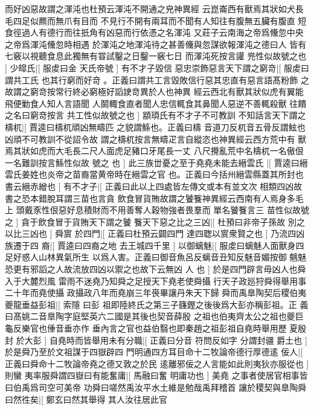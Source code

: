 而好凶惡故謂之渾沌也杜預云渾沌不開通之皃神異經%
%
云崑崙西有獸焉其狀如犬長毛四足似羆而無爪有目而%
不見行不開有兩耳而不聞有人知往有腹無五臟有腹直%
%
短食徑過人有德行而往扺角有凶惡而行依憑之名渾沌%
又莊子云南海之帝爲儵忽中央之帝爲渾沌儵忽時相遇%
%
於渾沌之地渾沌待之甚善儵與忽謀欲報渾沌之德曰人%
皆有七竅以視聽食息此獨無有甞試鑿之日鑿一竅七日%
%
而渾沌死按言讙%
兠性似故號之也%
]%
少皡氏|[%
服䖍曰金%
天氏帝號%
]%
有不才子毀信%
惡忠崇飾惡言天下謂之窮竒|[%
服䖍曰謂共工氏%
也其行窮而好竒%
%
。正義曰謂共工言毀敗信行惡其忠直有惡言語髙粉飾%
之故謂之窮竒按常行終必窮極好謟䛕竒異於人也神異%
%
經云西北有獸其狀似虎有翼能飛便勦食人知人言語聞%
人鬬輙食直者聞人忠信輒食其鼻聞人惡逆不善輒殺獸%
%
往饋之名曰窮竒按言%
共工性似故號之也%
]%
顓頊氏有不才子不可教訓%
不知話言天下謂之檮杌|[%
賈逵曰檮杌頑凶無疇匹%
之貌謂鯀也。正義曰檮%
%
音道刀反杌音五骨反謂鮌也凶頑不可教訓不從詔令故%
謂之檮杌按言無疇疋言自縱恣也神異經云西方荒中有%
%
獸焉其狀如虎而大毛長二尺人面虎足豬口牙尾長一丈%
八尺攪亂荒中名檮杌一名傲佷一名難訓按言鯀性似故%
%
號之%
也%
]%
此三族丗憂之至于堯堯未能去縉雲氏%
|[%
賈逵曰縉雲氏姜姓也炎帝之苗裔當黄帝時在縉雲之官%
也。正義曰今括州縉雲縣蓋其所封也書云縉赤繒也%
]%
有不才子|[%
正義曰此以上四處皆左傳文或本有並文次%
相類四凶故書之恐本錯脫耳謂三苗也言貪%
%
飲食冒貨賄故謂之饕餮神異經云西南有人焉身多毛上%
頭戴豕性佷惡好息積財而不用善奪人穀物強者畏羣而%
%
單名饕餮言三%
苗性似故號之%
]%
貪于飲食冒于貨賄天下謂之饕%
餮天下惡之比之三凶|[%
杜預曰非帝子孫故%
別之以比三凶也%
]%
舜賔%
於四門|[%
正義曰杜預云闢四門%
達四聦以賔衆賢之也%
]%
乃流四凶族遷于四%
裔|[%
賈逵曰四裔之地%
去王城四千里%
]%
以御螭魅|[%
服䖍曰螭魅人面獸身四%
足好惑人山林異氣所生%
%
以爲人害。正義曰御音魚呂反螭音丑知反魅音媚按御%
魑魅恐更有邪謟之人故流放四凶以禦之也故下云無凶%
%
人%
也%
]%
於是四門辟言毋凶人也舜入于大麓烈風%
雷雨不迷堯乃知舜之足授天下堯老使舜攝%
行天子政廵狩舜得舉用事二十年而堯使攝%
政攝政八年而堯崩三年䘮畢讓丹朱天下歸%
舜而禹臯陶契后稷伯夷夔龍垂益彭祖|[%
索隱%
曰彭%
%
祖即陸終氏之第三子籛鏗之後後爲大彭亦稱彭祖。正%
義曰髙姚二音臯陶字庭堅英六二國是其後也契音薛殷%
%
之祖也伯夷齊太公之祖也夔巨龜反樂官也倕音垂亦作%
垂內言之官也益伯翳也即秦趙之祖彭祖自堯時舉用歷%
%
夏殷封%
於大彭%
]%
自堯時而皆舉用未有分職|[%
正義曰分音%
符問反如字%
%
分謂封疆%
爵土也%
]%
於是舜乃至於文祖謀于四嶽辟四%
門明通四方耳目命十二牧論帝德行厚德逺%
佞人|[%
正義曰舜命十二牧論帝堯之德又敦之於民%
逺離邪佞之人言能如此則夷狄亦服從也%
]%
則蠻%
夷率服舜謂四嶽曰有能奮庸|[%
馬融曰奮%
明庸功也%
]%
美堯%
之事者使居官相事皆曰伯禹爲司空可美帝%
功舜曰嗟然禹汝平水土維是勉哉禹拜稽首%
讓於稷契與臯陶舜曰然徃矣|[%
鄭玄曰然其舉得%
其人汝往居此官%
%
